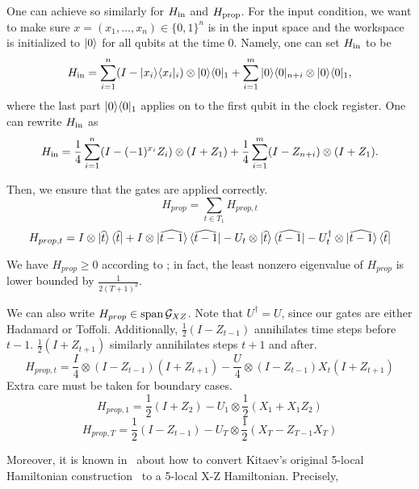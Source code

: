 One can achieve so similarly for $H_{\mathrm{in}}$ and $H_{\mathrm{prop}}$. For the input condition, we want to make sure $x=(x_1, \ldots, x_n) \in \{0,1\}^n$ is in the input space and the workspace is initialized to $\ket{0}$ for all qubits at the time $0$. Namely, one can set $H_{\mathrm{in}}$ to be
\begin{equation}
    H_{\mathrm{in}} = \sum_{i=1}^n(I- |x_i\rangle\langle x_i|_i)\otimes |0\rangle\langle 0|_1 + \sum_{i=1}^m |0\rangle\langle 0|_{n+i} \otimes |0\rangle\langle 0|_1, 
\end{equation}
where the last part $|0\rangle\langle 0|_1$ applies on to the first qubit in the clock register. One can rewrite $H_{\mathrm{in}}$ as 
\begin{equation}
 H_{\mathrm{in}}=\frac{1}{4}\sum_{i=1}^n(I-(-1)^{x_i}Z_i)\otimes(I+Z_1) + \frac{1}{4} \sum_{i=1}^m (I - Z_{n+i}) \otimes (I + Z_1). 
\end{equation}


	Then, we ensure that the gates are applied correctly.
	$$H_{prop}=\sum_{t\in T_1}H_{prop,t}$$
	$$H_{prop,t}=I\otimes\ket{\widehat{t}}\bra{\widehat{t}}
	+I\otimes\ket{\widehat{t-1}}\bra{\widehat{t-1}}
	-U_t\otimes\ket{\widehat{t}}\bra{\widehat{t-1}}
	-U_t^\dagger\otimes\ket{\widehat{t-1}}\bra{\widehat{t}}$$

	We have $H_{prop}\geq 0$ according to \cite{2002quant.ph.10077A}; in fact, the least nonzero eigenvalue of $H_{prop}$ is lower bounded by $\frac{1}{2(T+1)^2}$.

	We can also write $H_{prop}\in\operatorname*{\operatorname{span}}\mathcal{G}_{XZ}$. Note that $U^\dagger=U$, since our gates are either Hadamard or Toffoli.
	Additionally, $\frac{1}{2}(I-Z_{t-1})$ annihilates time steps before $t-1$. $\frac{1}{2}(I+Z_{t+1})$ similarly annihilates steps $t+1$ and after.
	$$H_{prop,t}=\frac{I}{4}\otimes(I-Z_{t-1})(I+Z_{t+1})-\frac{U}{4}\otimes(I-Z_{t-1})X_t(I+Z_{t+1})$$
	Extra care must be taken for boundary cases.
	$$H_{prop,1}=\frac{1}{2}(I+Z_2)-U_1\otimes\frac{1}{2}(X_1+X_1Z_2)$$
	$$H_{prop,T}=\frac{1}{2}(I-Z_{t-1})-U_T\otimes\frac{1}{2}(X_T-Z_{T-1}X_T)$$


Moreover, it is known in~\cite{PhysRevA.78.012352} about how to convert Kitaev's original 5-local Hamiltonian construction~\cite{kitaev2002classical} to a 5-local X-Z Hamiltonian. Precisely, 






